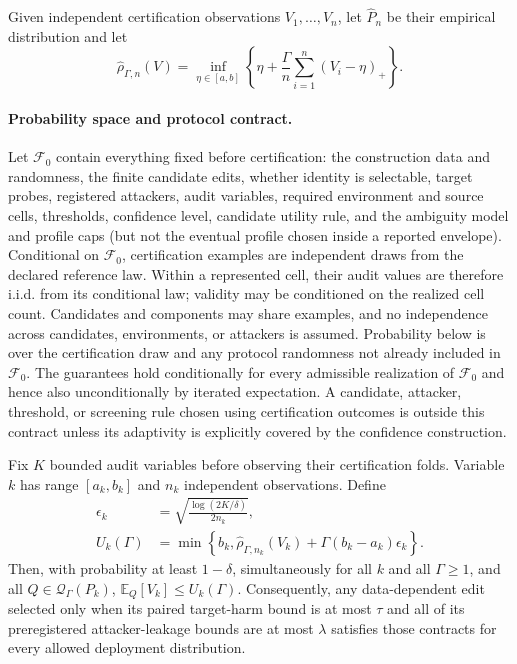 Given independent certification observations $V_1,\ldots,V_n$, let
$\widehat P_n$
be their empirical distribution and let
\begin{equation}
  \widehat\rho_{\Gamma,n}(V)
  =\inf_{\eta\in[a,b]}
  \left\{\eta+\frac{\Gamma}{n}\sum_{i=1}^n(V_i-\eta)_+\right\}.
\end{equation}

\paragraph{Probability space and protocol contract.}
Let $\mathcal F_0$ contain everything fixed before certification: the
construction data and randomness, the finite candidate edits, whether identity
is selectable, target probes, registered attackers, audit variables, required
environment and source cells, thresholds, confidence level, candidate utility
rule, and the ambiguity model and profile caps (but not the eventual profile
chosen inside a reported envelope). Conditional on
$\mathcal F_0$, certification examples are independent draws from the declared
reference law. Within a represented cell, their audit values are therefore
i.i.d. from its conditional law; validity may be conditioned on the realized
cell count. Candidates and components may share examples, and no independence
across candidates, environments, or attackers is assumed. Probability below is
over the certification draw and any protocol randomness not already included
in $\mathcal F_0$. The guarantees hold conditionally for every admissible
realization of $\mathcal F_0$ and hence also unconditionally by iterated
expectation. A candidate, attacker, threshold, or screening rule chosen using
certification outcomes is outside this contract unless its adaptivity is
explicitly covered by the confidence construction.

\begin{theorem}
\label{thm:robust-paired}
Fix $K$ bounded audit variables before observing their certification folds.
Variable $k$ has range $[a_k,b_k]$ and $n_k$ independent observations.  Define
\begin{equation}
\begin{aligned}
 \epsilon_k&=\sqrt{\frac{\log(2K/\delta)}{2n_k}},\\
 U_k(\Gamma)&=\min\left\{b_k,
 \widehat\rho_{\Gamma,n_k}(V_k)
 +\Gamma(b_k-a_k)\epsilon_k\right\}.
\end{aligned}
\end{equation}
Then, with probability at least $1-\delta$, simultaneously for all $k$ and
all $\Gamma\geq1$, and all $Q\in\mathcal{Q}_{\Gamma}(P_k)$,
$\mathbb{E}_Q[V_k]\leq U_k(\Gamma)$.
Consequently, any data-dependent edit selected only when its paired target-harm
bound is at most $\tau$ and all of its preregistered attacker-leakage bounds
are at most $\lambda$ satisfies those contracts for every allowed deployment
distribution.
\end{theorem}

